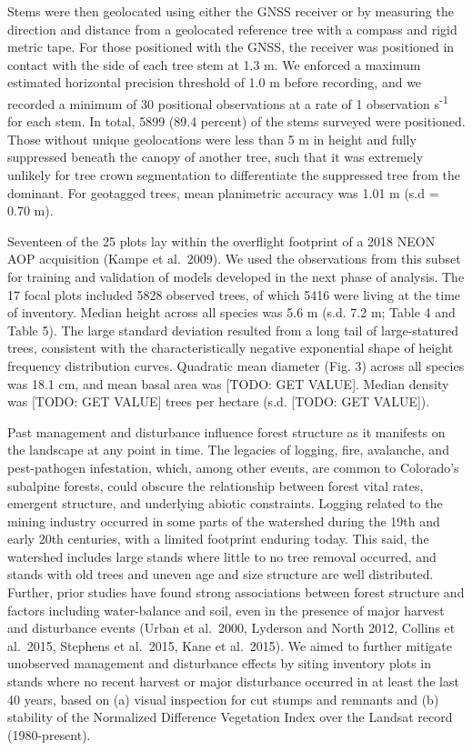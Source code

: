 \documentclass[
  12pt,
]{article}
\begin{document}
Stems were then geolocated using either the GNSS receiver or by
measuring the direction and distance from a geolocated reference tree
with a compass and rigid metric tape. For those positioned with the
GNSS, the receiver was positioned in contact with the side of each tree
stem at 1.3 m. We enforced a maximum estimated horizontal precision
threshold of 1.0 m before recording, and we recorded a minimum of 30
positional observations at a rate of 1 observation s\textsuperscript{-1}
for each stem. In total, 5899 (89.4 percent) of the stems surveyed were
positioned. Those without unique geolocations were less than 5 m in
height and fully suppressed beneath the canopy of another tree, such
that it was extremely unlikely for tree crown segmentation to
differentiate the suppressed tree from the dominant. For geotagged
trees, mean planimetric accuracy was 1.01 m (s.d = 0.70 m).

Seventeen of the 25 plots lay within the overflight footprint of a 2018
NEON AOP acquisition (Kampe et al.~2009). We used the observations from
this subset for training and validation of models developed in the next
phase of analysis. The 17 focal plots included 5828 observed trees, of
which 5416 were living at the time of inventory. Median height across
all species was 5.6 m (s.d. 7.2 m; Table 4 and Table 5). The large
standard deviation resulted from a long tail of large-statured trees,
consistent with the characteristically negative exponential shape of
height frequency distribution curves. Quadratic mean diameter (Fig. 3)
across all species was 18.1 cm, and mean basal area was {[}TODO: GET
VALUE{]}. Median density was {[}TODO: GET VALUE{]} trees per hectare
(s.d. {[}TODO: GET VALUE{]}).

Past management and disturbance influence forest structure as it
manifests on the landscape at any point in time. The legacies of
logging, fire, avalanche, and pest-pathogen infestation, which, among
other events, are common to Colorado's subalpine forests, could obscure
the relationship between forest vital rates, emergent structure, and
underlying abiotic constraints. Logging related to the mining industry
occurred in some parts of the watershed during the 19th and early 20th
centuries, with a limited footprint enduring today. This said, the
watershed includes large stands where little to no tree removal
occurred, and stands with old trees and uneven age and size structure
are well distributed. Further, prior studies have found strong
associations between forest structure and factors including
water-balance and soil, even in the presence of major harvest and
disturbance events (Urban et al.~2000, Lyderson and North 2012, Collins
et al.~2015, Stephens et al.~2015, Kane et al.~2015). We aimed to
further mitigate unobserved management and disturbance effects by siting
inventory plots in stands where no recent harvest or major disturbance
occurred in at least the last 40 years, based on (a) visual inspection
for cut stumps and remnants and (b) stability of the Normalized
Difference Vegetation Index over the Landsat record (1980-present).
\end{document}
